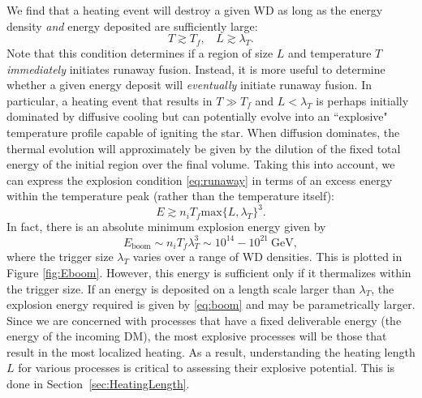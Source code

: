 \documentclass[twocolumn,showpacs,preprintnumbers,amsmath,amssymb,prd]{revtex4}
\newcommand{\GeV}{\text{GeV}}
\begin{document}
We find that a heating event will destroy a given WD as long as the energy density \emph{and} energy deposited are sufficiently large:
\begin{equation}
\label{eq:runaway}
T \gtrsim T_f, ~~~~ L \gtrsim \lambda_T.
\end{equation}
Note that this condition determines if a region of size $L$ and temperature $T$ \emph{immediately} initiates runaway fusion.  Instead, it is more useful to determine whether a given energy deposit will \emph{eventually} initiate runaway fusion. In particular, a heating event that results in $T \gg T_f$ and $L  < \lambda_T$ is perhaps initially dominated by diffusive cooling but can potentially evolve into an ``explosive" temperature profile capable of igniting the star. When diffusion dominates, the thermal evolution will approximately be given by the dilution of the fixed total energy of the initial region over the final volume. Taking this into account, we can express the explosion condition \eqref{eq:runaway} in terms of an excess energy within the temperature peak (rather than the temperature itself):
\begin{equation}
\label{eq:boom}
E \gtrsim n_i T_f \text{max}\{L, \lambda_T\}^3.
\end{equation}
In fact, there is an absolute minimum explosion energy given by
\begin{equation}
E_{\text{boom}} \sim n_i T_f \lambda_T^3 \sim 10^{14} - 10^{21} ~\GeV,
\end{equation}
where the trigger size $\lambda_T$ varies over a range of WD densities. This is plotted in Figure \ref{fig:Eboom}. However, this energy is sufficient only if it thermalizes within the trigger size.  If an energy is deposited on a length scale larger than $\lambda_T$, the explosion energy required is given by \eqref{eq:boom} and may be parametrically larger. Since we are concerned with processes that have a fixed deliverable energy (the energy of the incoming DM), the most explosive processes will be those that result in the most localized heating. As a result, understanding the heating length $L$ for various processes is critical to assessing their explosive potential. This is done in Section~\ref{sec:HeatingLength}.
\end{document}
